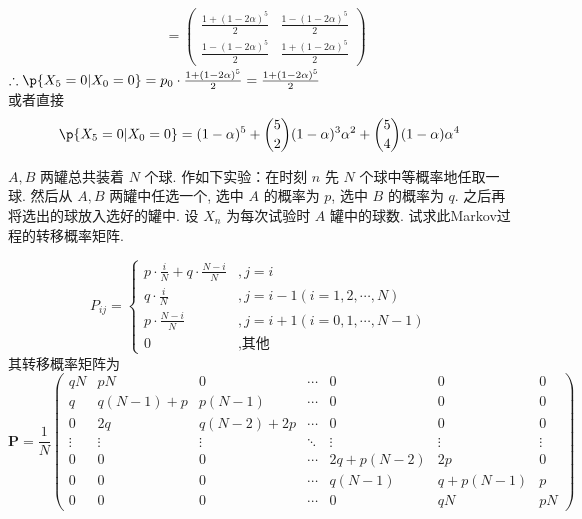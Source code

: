 \begin{solution}
\begin{enumerate}[label=(\alph*)]
\[\begin{aligned}
				                              & = \begin{pmatrix}
					                                  \frac{1+(1-2\alpha)^5}{2} & \frac{1-(1-2\alpha)^5}{2} \\ \frac{1-(1-2\alpha)^5}{2}& \frac{1+(1-2\alpha)^5}{2}
				                                  \end{pmatrix}
			      \end{aligned}\]
		      $\therefore \p\{ X_5 = 0 | X_0 = 0\} = p_0 \cdot \frac{1+(1-2\alpha)^5}{2} = \frac{1+(1-2\alpha)^5}{2}$\\
		      或者直接\[\p\{X_5=0|X_0=0\}=(1-\alpha)^5 +\binom{5}{2}(1-\alpha)^3 \alpha ^2 +\binom{5}{4}(1-\alpha )\alpha ^4\]
	\end{enumerate}
\end{solution}

\begin{problem}{3.4}
$A, B$ 两罐总共装着 $N$ 个球. 作如下实验：在时刻 $n$ 先 $N$ 个球中等概率地任取一球. 然后从 $A, B$ 两罐中任选一个, 选中 $A$ 的概率为 $p$, 选中 $B$ 的概率为 $q$. 之后再将选出的球放入选好的罐中. 设 $X_n$ 为每次试验时 $A$ 罐中的球数. 试求此Markov过程的转移概率矩阵.
\end{problem}
\begin{solution}
	\[P_{ij} =
		\begin{cases}
			p \cdot \frac{i}{N} + q \cdot \frac{N-i}{N} & , j = i                      \\
			q \cdot \frac{i}{N}                         & , j = i-1(i=1,2,\cdots ,N)   \\
			p \cdot \frac{N-i}{N}                       & , j = i+1(i=0,1,\cdots ,N-1) \\
			0                                           & , \text{其他}
		\end{cases}\]
	其转移概率矩阵为
	\[\bm{P} = \frac{1}{N}
		\begin{pmatrix}
			qN     & pN       & 0         & \cdots & 0         & 0        & 0      \\
			q      & q(N-1)+p & p(N-1)    & \cdots & 0         & 0        & 0      \\
			0      & 2q       & q(N-2)+2p & \cdots & 0         & 0        & 0      \\
			\vdots & \vdots   & \vdots    & \ddots & \vdots    & \vdots   & \vdots \\
			0      & 0        & 0         & \cdots & 2q+p(N-2) & 2p       & 0      \\
			0      & 0        & 0         & \cdots & q(N-1)    & q+p(N-1) & p      \\
			0      & 0        & 0         & \cdots & 0         & qN       & pN
		\end{pmatrix}\]
\end{solution}

